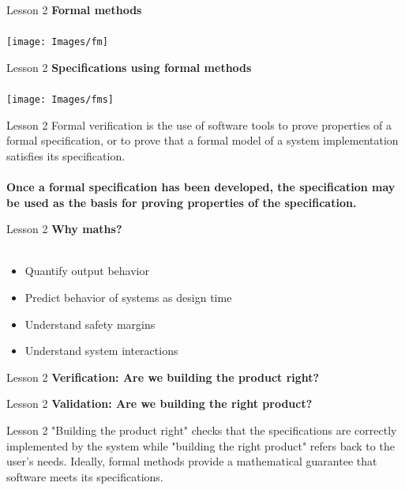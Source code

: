 \documentclass[aspectratio=1610]{beamer}
\begin{document}
\begin{frame}{Lesson 2}{}
\LARGE
\textbf{Formal methods}\\~\\
\texttt{[image: Images/fm]}
\end{frame}


\begin{frame}{Lesson 2}{}
\LARGE
\textbf{Specifications using formal methods}\\~\\
\texttt{[image: Images/fms]}
\end{frame}


\begin{frame}{Lesson 2}{}
\LARGE
    Formal verification is the use of software tools to prove properties of a formal specification, or to prove that a formal model of a system implementation satisfies its specification.\\~\\
\textbf{Once a formal specification has been developed, the specification may be used as the basis for proving properties of the specification.}
\end{frame}

\begin{frame}{Lesson 2}{}
\LARGE
\textbf{Why maths?}\\~\\
\begin{itemize}
    \item Quantify output behavior
    \item Predict behavior of systems as design time
    \item Understand safety margins
    \item Understand system interactions
\end{itemize}
\end{frame}


\begin{frame}{Lesson 2}{}
\LARGE
    \textbf{Verification: Are we building the product right?}

\end{frame}

\begin{frame}{Lesson 2}{}
\LARGE
    \textbf{Validation: Are we building the right product?}
\end{frame}

\begin{frame}{Lesson 2}{}
\LARGE
"Building the product right" checks that the specifications are correctly implemented by the system while "building the right product" refers back to the user's needs. Ideally, formal methods provide a mathematical guarantee that software meets its specifications.
\end{frame}
\end{document}
